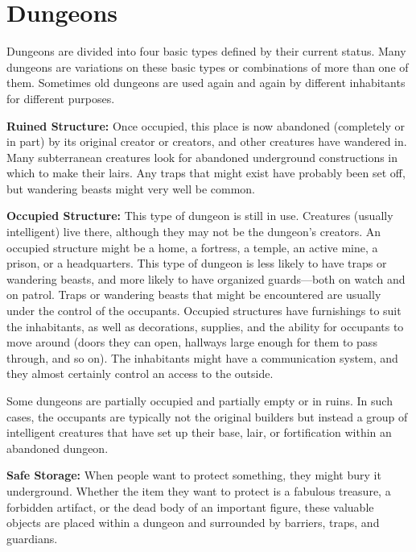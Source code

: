 \section{Dungeons}
Dungeons are divided into four basic types defined by their current status. Many dungeons are variations on these basic types or combinations of more than one of them. Sometimes old dungeons are used again and again by different inhabitants for different purposes.

\textbf{Ruined Structure:} Once occupied, this place is now abandoned (completely or in part) by its original creator or creators, and other creatures have wandered in. Many subterranean creatures look for abandoned underground constructions in which to make their lairs. Any traps that might exist have probably been set off, but wandering beasts might very well be common.

\textbf{Occupied Structure:} This type of dungeon is still in use. Creatures (usually intelligent) live there, although they may not be the dungeon's creators. An occupied structure might be a home, a fortress, a temple, an active mine, a prison, or a headquarters. This type of dungeon is less likely to have traps or wandering beasts, and more likely to have organized guards---both on watch and on patrol. Traps or wandering beasts that might be encountered are usually under the control of the occupants. Occupied structures have furnishings to suit the inhabitants, as well as decorations, supplies, and the ability for occupants to move around (doors they can open, hallways large enough for them to pass through, and so on). The inhabitants might have a communication system, and they almost certainly control an access to the outside.

Some dungeons are partially occupied and partially empty or in ruins. In such cases, the occupants are typically not the original builders but instead a group of intelligent creatures that have set up their base, lair, or fortification within an abandoned dungeon.

\textbf{Safe Storage:} When people want to protect something, they might bury it underground. Whether the item they want to protect is a fabulous treasure, a forbidden artifact, or the dead body of an important figure, these valuable objects are placed within a dungeon and surrounded by barriers, traps, and guardians.

